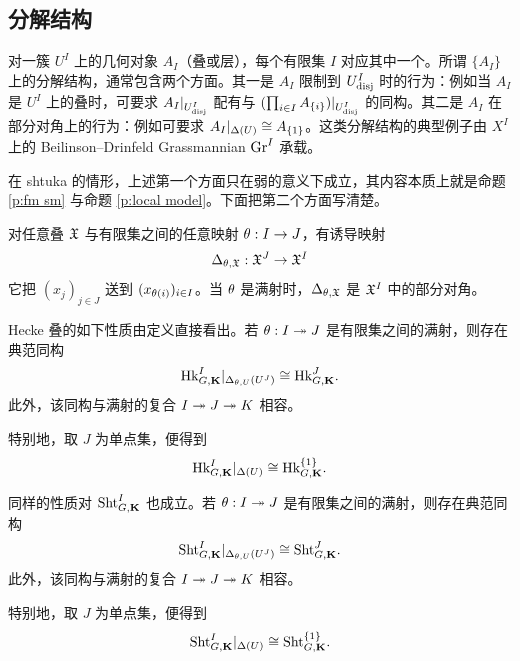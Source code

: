 
\subsection{分解结构}\label{ss:geom fact}

对一簇 $U^{I}$ 上的几何对象 $A_{I}$（叠或层），每个有限集 $I$ 对应其中一个。所谓 $\{A_{I}\}$ 上的分解结构，通常包含两个方面。其一是 $A_{I}$ 限制到 $U^{I}_{\mathrm{disj}}$ 时的行为：例如当 $A_{I}$ 是 $U^{I}$ 上的叠时，可要求 $A_{I}|_{U^{I}_{\mathrm{disj}}}$ 配有与 $(\prod_{i\in I}A_{\{i\}})|_{U^{I}_{\mathrm{disj}}}$ 的同构。其二是 $A_{I}$ 在部分对角上的行为：例如可要求 $A_{I}|_{\Delta(U)}\cong A_{\{1\}}$。这类分解结构的典型例子由 $X^{I}$ 上的 Beilinson--Drinfeld Grassmannian $\textup{Gr}^{I}$ 承载。

在 shtuka 的情形，上述第一个方面只在弱的意义下成立，其内容本质上就是命题 \ref{p:fm sm} 与命题 \ref{p:local model}。下面把第二个方面写清楚。

对任意叠 $\mathfrak{X}$ 与有限集之间的任意映射 $\theta: I\to J$，有诱导映射
\begin{equation*}
\Delta_{\theta, \mathfrak{X}}: \mathfrak{X}^{J}\to \mathfrak{X}^{I}
\end{equation*}
它把 $(x_{j})_{j\in J}$ 送到 $(x_{\theta(i)})_{i\in I}$。当 $\theta$ 是满射时，$\Delta_{\theta,\mathfrak{X}}$ 是 $\mathfrak{X}^{I}$ 中的部分对角。

Hecke 叠的如下性质由定义直接看出。若 $\theta: I\twoheadrightarrow J$ 是有限集之间的满射，则存在典范同构
\begin{equation}\label{Hk diagonal}
\textup{Hk}^{I}_{G,\mathbf{K}}|_{\Delta_{\theta,U}(U^{J})}\cong \textup{Hk}^{J}_{G,\mathbf{K}}.
\end{equation}
此外，该同构与满射的复合 $I\twoheadrightarrow J\twoheadrightarrow K$ 相容。

特别地，取 $J$ 为单点集，便得到
\begin{equation*}
\textup{Hk}^{I}_{G,\mathbf{K}}|_{\Delta(U)}\cong \textup{Hk}^{\{1\}}_{G,\mathbf{K}}.
\end{equation*}

同样的性质对 $\textup{Sht}^{I}_{G,\mathbf{K}}$ 也成立。若 $\theta: I\twoheadrightarrow J$ 是有限集之间的满射，则存在典范同构
\begin{equation*}
\textup{Sht}^{I}_{G,\mathbf{K}}|_{\Delta_{\theta,U}(U^{J})}\cong \textup{Sht}^{J}_{G,\mathbf{K}}.
\end{equation*}
此外，该同构与满射的复合 $I\twoheadrightarrow J\twoheadrightarrow K$ 相容。

特别地，取 $J$ 为单点集，便得到
\begin{equation*}
\textup{Sht}^{I}_{G,\mathbf{K}}|_{\Delta(U)}\cong \textup{Sht}^{\{1\}}_{G,\mathbf{K}}.
\end{equation*}

